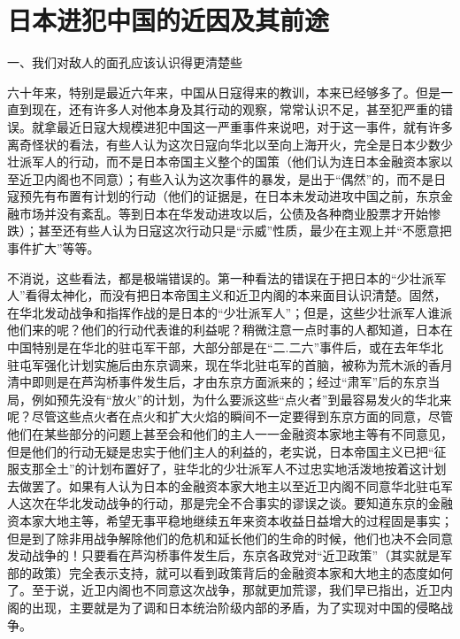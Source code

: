 \section[日本进犯中国的近因及其前途（一九三七年）]{日本进犯中国的近因及其前途}


一、我们对敌人的面孔应该认识得更清楚些

六十年来，特别是最近六年来，中国从日寇得来的教训，本来已经够多了。但是一直到现在，还有许多人对他本身及其行动的观察，常常认识不足，甚至犯严重的错误。就拿最近日寇大规模进犯中国这一严重事件来说吧，对于这一事件，就有许多离奇怪状的看法，有些人认为这次日寇向华北以至向上海开火，完全是日本少数少壮派军人的行动，而不是日本帝国主义整个的国策（他们认为连日本金融资本家以至近卫内阁也不同意）；有些入认为这次事件的暴发，是出于“偶然”的，而不是日寇预先有布置有计划的行动（他们的证据是，在日本未发动进攻中国之前，东京金融市场并没有紊乱。等到日本在华发动进攻以后，公债及各种商业股票才开始惨跌）；甚至还有些人认为日寇这次行动只是“示威”性质，最少在主观上并“不愿意把事件扩大”等等。

不消说，这些看法，都是极端错误的。第一种看法的错误在于把日本的“少壮派军人”看得太神化，而没有把日本帝国主义和近卫内阁的本来面目认识清楚。固然，在华北发动战争和指挥作战的是日本的“少壮派军人”；但是，这些少壮派军人谁派他们来的呢？他们的行动代表谁的利益呢？稍微注意一点时事的人都知道，日本在中国特别是在华北的驻屯军干部，大部分部是在“二.二六”事件后，或在去年华北驻屯军强化计划实施后由东京调来，现在华北驻屯军的首脑，被称为荒木派的香月清中即则是在芦沟桥事件发生后，才由东京方面派来的；经过“肃军”后的东京当局，例如预先没有“放火”的计划，为什么要派这些“点火者”到最容易发火的华北来呢？尽管这些点火者在点火和扩大火焰的瞬间不一定要得到东京方面的同意，尽管他们在某些部分的问题上甚至会和他们的主人一一金融资本家地主等有不同意见，但是他们的行动无疑是忠实于他们主人的利益的，老实说，日本帝国主义已把“征服支那全土”的计划布置好了，驻华北的少壮派军人不过忠实地活泼地按着这计划去做罢了。如果有人认为日本的金融资本家大地主以至近卫内阁不同意华北驻屯军人这次在华北发动战争的行动，那是完全不合事实的谬误之谈。要知道东京的金融资本家大地主等，希望无事平稳地继续五年来资本收益日益增大的过程固是事实；但是到了除非用战争解除他们的危机和延长他们的生命的时候，他们也决不会同意发动战争的！只要看在芦沟桥事件发生后，东京各政党对“近卫政策”（其实就是军部的政策）完全表示支持，就可以看到政策背后的金融资本家和大地主的态度如何了。至于说，近卫内阁也不同意这次战争，那就更加荒谬，我们早已指出，近卫内阁的出现，主要就是为了调和日本统治阶级内部的矛盾，为了实现对中国的侵略战争。

